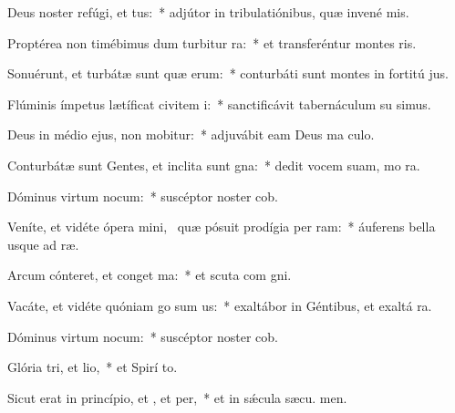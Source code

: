 \item Deus noster refúgi, et tus:~* adjútor in tribulatiónibus, quæ invené  mis.
\item Proptérea non timébimus dum turbitur ra:~* et transferéntur montes   ris.
\item Sonuérunt, et turbátæ sunt quæ erum:~* conturbáti sunt montes in fortitú jus.
\item Flúminis ímpetus lætíficat civitem i:~* sanctificávit tabernáculum su simus.
\item Deus in médio ejus, non mobitur:~* adjuvábit eam Deus ma culo.
\item Conturbátæ sunt Gentes, et inclita sunt gna:~* dedit vocem suam, mo  ra.
\item Dóminus virtum nocum:~* suscéptor noster  cob.
\item Veníte, et vidéte ópera mini,~\pscross{} quæ pósuit prodígia per ram:~* áuferens bella usque ad  ræ.
\item Arcum cónteret, et conget ma:~* et scuta com gni.
\item Vacáte, et vidéte quóniam go sum us:~* exaltábor in Géntibus, et exaltá  ra.
\item Dóminus virtum nocum:~* suscéptor noster  cob.
\item Glória tri, et lio,~* et Spirí to.
\item Sicut erat in princípio, et , et per,~* et in sǽcula sæcu. men.
